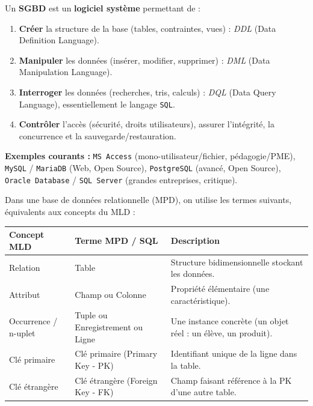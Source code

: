 \documentclass[11pt]{article}
\newcommand{\cle}[1]{{\popxbold\color{popdark}#1}}
\begin{document}
\begin{definition}
Un \textbf{SGBD} est un \textbf{logiciel système} permettant de :
\begin{enumerate}
    \item \textbf{Créer} la structure de la base (tables, contraintes, vues) : \emph{DDL} (Data Definition Language).
    \item \textbf{Manipuler} les données (insérer, modifier, supprimer) : \emph{DML} (Data Manipulation Language).
    \item \textbf{Interroger} les données (recherches, tris, calculs) : \emph{DQL} (Data Query Language), essentiellement le langage \texttt{SQL}.
    \item \textbf{Contrôler} l'accès (sécurité, droits utilisateurs), assurer l'intégrité, la concurrence et la sauvegarde/restauration.
\end{enumerate}
\textbf{Exemples courants :} \texttt{MS Access} (mono-utilisateur/fichier, pédagogie/PME), \texttt{MySQL} / \texttt{MariaDB} (Web, Open Source), \texttt{PostgreSQL} (avancé, Open Source), \texttt{Oracle Database} / \texttt{SQL Server} (grandes entreprises, critique).
\end{definition}

\begin{definition}
Dans une base de données relationnelle (MPD), on utilise les termes suivants, équivalents aux concepts du MLD :
\begin{center}
\begin{tabularx}{\linewidth}{|l|X|X|}
\hline
\rowcolor{popblueL}
\textbf{Concept MLD} & \textbf{Terme MPD / SQL} & \textbf{Description} \\
\hline
Relation & \cle{Table} & Structure bidimensionnelle stockant les données. \\
Attribut & \cle{Champ} ou \cle{Colonne} & Propriété élémentaire (une caractéristique). \\
Occurrence / n-uplet & \cle{Tuple} ou \cle{Enregistrement} ou \cle{Ligne} & Une instance concrète (un objet réel : un élève, un produit). \\
Clé primaire & \cle{Clé primaire} (Primary Key - PK) & Identifiant unique de la ligne dans la table. \\
Clé étrangère & \cle{Clé étrangère} (Foreign Key - FK) & Champ faisant référence à la PK d'une autre table. \\
\hline
\end{tabularx}
\end{center}
\end{definition}
\end{document}
